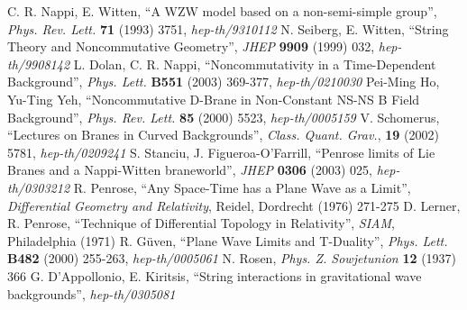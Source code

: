 \documentclass[11pt, a4paper, titlepage]{article}
\begin{document}

\begin{thebibliography}{100}
 C. R. Nappi, E. Witten, ``A WZW model based on a non-semi-simple
  group'', \textit{Phys. Rev. Lett.} \textbf{71} (1993) 3751,
  \textit{hep-th/9310112}
 N. Seiberg, E. Witten, ``String Theory and Noncommutative
  Geometry'', \textit{JHEP} \textbf{9909} (1999) 032, \textit{hep-th/9908142}
 L. Dolan, C. R. Nappi, ``Noncommutativity in a Time-Dependent
  Background'', \textit{Phys. Lett.} \textbf{B551} (2003) 369-377,
  \textit{hep-th/0210030}
 Pei-Ming Ho, Yu-Ting Yeh, ``Noncommutative D-Brane in
  Non-Constant NS-NS B Field Background'', \textit{Phys. Rev. Lett.}
  \textbf{85} (2000) 5523, \textit{hep-th/0005159}
 V. Schomerus, ``Lectures on Branes in Curved Backgrounds'',
  \textit{Class. Quant. Grav.}, \textbf{19} (2002) 5781, \textit{hep-th/0209241}
 S. Stanciu, J. Figueroa-O'Farrill, ``Penrose limits of Lie
  Branes and a Nappi-Witten braneworld'', \textit{JHEP} \textbf{0306} (2003)
  025, \textit{hep-th/0303212}
 R. Penrose, ``Any Space-Time has a Plane Wave as a Limit'',
  \textit{Differential Geometry and Relativity}, Reidel, Dordrecht (1976)
  271-275
 D. Lerner, R. Penrose, ``Technique of Differential Topology in
  Relativity'', \textit{SIAM}, Philadelphia (1971)
 R. G\"{u}ven, ``Plane Wave Limits and T-Duality'', \textit{Phys.
    Lett.} \textbf{B482} (2000) 255-263, \textit{hep-th/0005061}
 N. Rosen, \textit{Phys. Z. Sowjetunion} \textbf{12} (1937) 366
 G. D'Appollonio, E. Kiritsis, ``String interactions in
  gravitational wave backgrounds'', \textit{hep-th/0305081}
\end{thebibliography}
\end{document}
